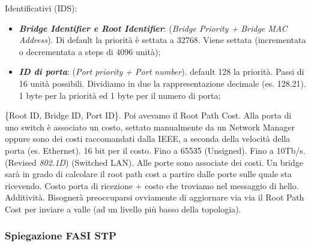 Identificativi (IDS):

\begin{itemize}

\item{\textit{\textbf{Bridge Identifier e Root Identifier}}}: (\textit{Bridge Priority + Bridge MAC Address}). Di default la priorità è settata a 32768. Viene settata (incrementata o decrementata a steps di 4096 unità);
\item{\textit{\textbf{ID di porta}}}: (\textit{Port priority + Port number}). default 128 la priorità. Passi di 16 unità possibili. Dividiamo in due la rappresentazione decimale (es. 128.21). 1 byte per la priorità ed 1 byte per il numero di porta;
\end{itemize}

\{Root ID, Bridge ID, Port ID\}. Poi avevamo il Root Path Cost. Alla porta di uno switch è associato un costo, settato manualmente da un Network Manager oppure sono dei costi raccomandati dalla IEEE, a seconda della velocità della porta (es. Ethernet). 16 bit per il costo. Fino a 65535 (Unsigned). Fino a 10Tb/s. (Revised \textit{802.1D}) (Switched LAN). Alle porte sono associate dei costi. Un bridge sarà in grado di calcolare il root path cost a partire dalle porte sulle quale sta ricevendo. Costo porta di ricezione + costo che troviamo nel messaggio di hello. Additività. Bisognerà preoccuparsi ovviamente di aggiornare via via il Root Path Cost per inviare a valle (ad un livello più basso della topologia).

\subsubsection{Spiegazione FASI STP}

